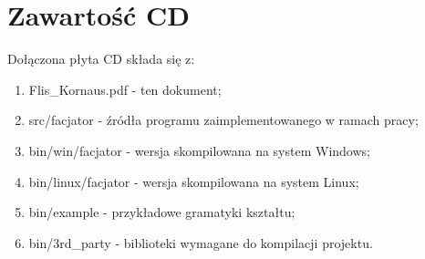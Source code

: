 \section{Zawartość CD}
Dołączona płyta CD składa się z:
\begin{enumerate}
  \item Flis\_Kornaus.pdf - ten dokument;
  \item src/facjator - źródła programu zaimplementowanego w
  ramach pracy;
  \item bin/win/facjator - wersja skompilowana na system Windows;
  \item bin/linux/facjator - wersja skompilowana na system Linux;
  \item bin/example - przykładowe gramatyki kształtu;
  \item bin/3rd\_party - biblioteki wymagane do kompilacji projektu.
\end{enumerate}